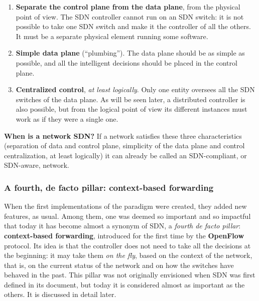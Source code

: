 \begin{enumerate}
\item \textbf{Separate the control plane from the data plane}, from the physical point of view. The SDN controller cannot run on an SDN switch: it is not possible to take one SDN switch and make it the controller of all the others. It must be a separate physical element running some software.
\item \textbf{Simple data plane} (``plumbing''). The data plane should be as simple as possible, and all the intelligent decisions should be placed in the control plane.
\item \textbf{Centralized control}, \emph{at least logically}. Only one entity oversees all the SDN switches of the data plane. As will be seen later, a distributed controller is also possible, but from the logical point of view its different instances must work as if they were a single one.
\end{enumerate}

\begin{notebox}
	\textbf{When is a network SDN?} If a network satisfies these three characteristics (separation of data and control plane, simplicity of the data plane and control centralization, at least logically) it can already be called an SDN-compliant, or SDN-aware, network.
\end{notebox}

\subsubsection*{A fourth, de facto pillar: context-based forwarding}

When the first implementations of the paradigm were created, they added new features, as usual. Among them, one was deemed so important and so impactful that today it has become almost a synonym of SDN, a \emph{fourth de facto pillar}: \textbf{context-based forwarding}, introduced for the first time by the \textbf{OpenFlow} protocol. Its idea is that the controller does not need to take all the decisions at the beginning: it may take them \emph{on the fly}, based on the context of the network, that is, on the current status of the network and on how the switches have behaved in the past. This pillar was not originally envisioned when SDN was first defined in its document, but today it is considered almost as important as the others. It is discussed in detail later.

